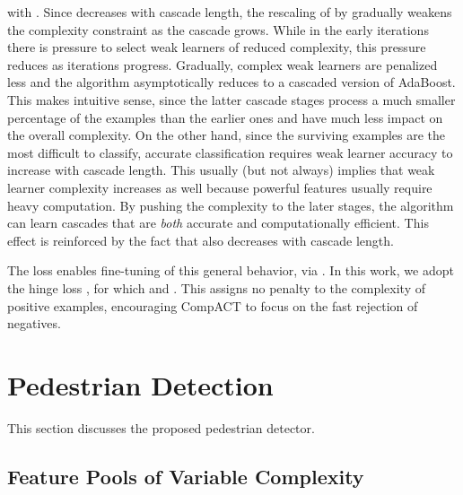 \documentclass[10pt,twocolumn,letterpaper]{article}
\begin{document}
with .
Since  decreases with cascade length, the rescaling of
 by  gradually weakens the complexity
constraint as the cascade grows. While in the early iterations there
is pressure to select weak learners of reduced complexity,
this pressure reduces as iterations progress. Gradually, complex weak learners are penalized less and the algorithm asymptotically reduces to a cascaded version of AdaBoost.
This makes intuitive sense, since the latter
cascade stages process a much smaller percentage of the examples
than the earlier ones and have much less impact on the overall complexity.
On the other hand, since the surviving examples are the most difficult to
classify, accurate classification requires weak learner
accuracy to increase  with cascade length. This usually (but not always) implies that weak learner complexity increases as well because powerful features usually require heavy computation. By pushing the complexity to the later
stages, the algorithm can learn cascades that are {\it both\/} accurate and
computationally efficient. This effect is reinforced by the fact
that  also decreases with cascade length.

The loss  enables fine-tuning of this general behavior,
via . In this work, we adopt the hinge loss
, for which  and
. This assigns no penalty to the complexity of positive
examples, encouraging CompACT to focus on the fast rejection of negatives.


\section{Pedestrian Detection}

This section discusses the proposed pedestrian detector.

\subsection{Feature Pools of Variable Complexity}
\label{sec:features}
\end{document}
